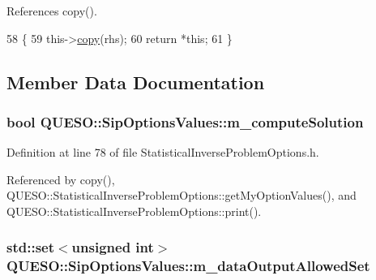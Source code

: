 References copy().


\begin{DoxyCode}
58 \{
59   this->\hyperlink{class_q_u_e_s_o_1_1_sip_options_values_a82009a049ab5e41592e33646bcf5c857}{copy}(rhs);
60   \textcolor{keywordflow}{return} *\textcolor{keyword}{this};
61 \}
\end{DoxyCode}


\subsection{Member Data Documentation}
\hypertarget{class_q_u_e_s_o_1_1_sip_options_values_a3ad6bcf891e7d938cc41ac47af698ab9}{
\subsubsection[{m\-\_\-compute\-Solution}]{\setlength{\rightskip}{0pt plus 5cm}bool Q\-U\-E\-S\-O\-::\-Sip\-Options\-Values\-::m\-\_\-compute\-Solution}}\label{class_q_u_e_s_o_1_1_sip_options_values_a3ad6bcf891e7d938cc41ac47af698ab9}


Definition at line 78 of file Statistical\-Inverse\-Problem\-Options.\-h.



Referenced by copy(), Q\-U\-E\-S\-O\-::\-Statistical\-Inverse\-Problem\-Options\-::get\-My\-Option\-Values(), and Q\-U\-E\-S\-O\-::\-Statistical\-Inverse\-Problem\-Options\-::print().

\hypertarget{class_q_u_e_s_o_1_1_sip_options_values_abda641263b3f677da5078fb3ea3f7102}{
\subsubsection[{m\-\_\-data\-Output\-Allowed\-Set}]{\setlength{\rightskip}{0pt plus 5cm}std\-::set$<$unsigned int$>$ Q\-U\-E\-S\-O\-::\-Sip\-Options\-Values\-::m\-\_\-data\-Output\-Allowed\-Set}}\label{class_q_u_e_s_o_1_1_sip_options_values_abda641263b3f677da5078fb3ea3f7102}


